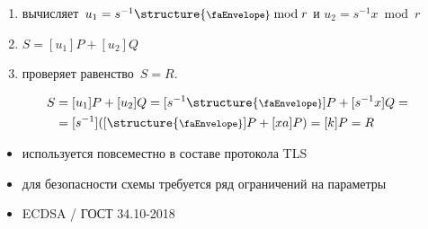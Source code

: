 \documentclass{beamer}
\begin{document}
	\begin{frame}
		\begin{enumerate}
			\item \structure{\faUserSecret} вычисляет~$u_1 = s^{-1} \text{\structure{\footnotesize\faEnvelope}} \bmod{r}$ и $u_2 = s^{-1} x \bmod{r}$
			\item $S = [u_1] P + [u_2] Q$
			\item проверяет равенство~$S = R$.
		\end{enumerate}
		
		\vspace{1em}
		\begin{align*}
			S &= 
			[u_1] P + [u_2] Q
			=%
			[s^{-1} \text{\structure{\footnotesize\faEnvelope}}] P + [s^{-1} x] Q 
			=\\&= [s^{-1}] ([\text{\structure{\footnotesize\faEnvelope}}] P + [x a] P)
			=%
			[k] P = R
		\end{align*}
		
		
	\end{frame}
	
	\begin{frame}{}
		\begin{itemize}
			\item используется повсеместно в составе протокола TLS
			\item для безопасности схемы требуется ряд ограничений на параметры
			\item ECDSA / ГОСТ 34.10-2018
		\end{itemize}
	\end{frame}
	
\end{document}
